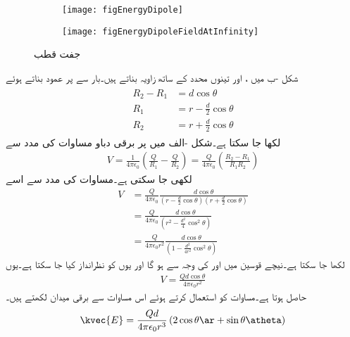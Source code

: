 \begin{figure}
\centering
\begin{subfigure}{0.5\textwidth}
\centering
\texttt{[image: figEnergyDipole]}
\end{subfigure}%
%
\begin{subfigure}{0.5\textwidth}
\centering
\texttt{[image: figEnergyDipoleFieldAtInfinity]}
\end{subfigure}%
\caption{جفت قطب}
\label{شکل_توانائی_جفت_قطب}
\end{figure}

شکل -ب میں ،  اور   تینوں  محدد کے ساتھ  زاویہ بناتے ہیں۔بار  سے  پر عمود بناتے ہوئے
\begin{gather}
\begin{aligned}\label{مساوات_توانائی_جفت_قطب_فاصلوں_میں_فرق}
R_2-R_1&=d \cos \theta \\
R_1 & =r-\frac{d}{2} \cos \theta\\
R_2 & =r+\frac{d}{2} \cos \theta
\end{aligned}
\end{gather}
لکھا جا سکتا ہے۔شکل -الف میں  پر برقی دباو  مساوات  کی مدد سے
\begin{align}\label{مساوات_توانائی_جفت_قطب_دباو_بنیادی_مساوات}
V=\frac{1}{4\pi \epsilon_0} \left(\frac{Q}{R_1}-\frac{Q}{R_2}\right)=\frac{Q}{4\pi \epsilon_0} \left(\frac{R_2-R_1}{R_1 R_2}\right)
\end{align}
لکھی جا سکتی ہے۔مساوات  کی مدد سے اسے
\begin{align*}
V&=\frac{Q}{4\pi \epsilon_0} \frac{d \cos \theta}{(r-\frac{d}{2} \cos \theta)(r+\frac{d}{2} \cos \theta)}\\
&=\frac{Q}{4\pi \epsilon_0} \frac{d \cos \theta}{(r^2-\frac{d^2}{4} \cos^2 \theta)}\\
&=\frac{Q}{4\pi \epsilon_0 r^2} \frac{d \cos \theta}{(1-\frac{d^2}{4 r^2} \cos^2 \theta)}
\end{align*}
لکھا جا سکتا ہے۔نیچے قوسین میں  اور  کی وجہ سے  ہو گا اور یوں  کو نظرانداز کیا جا سکتا ہے۔یوں
\begin{align}\label{مساوات_توانائی_جفت_قطب_دباو}
V=\frac{Qd \cos \theta}{4\pi \epsilon_0 r^2}
\end{align} 
حاصل ہوتا ہے۔مساوات  کو استعمال کرتے ہوئے اس مساوات سے برقی میدان لکھتے ہیں۔
\begin{align}\label{مساوات_توانائی_جفت_قطب_دور_میدان_الف}
\kvec{E}=\frac{Q d}{4\pi \epsilon_0 r^3}\left(2 \cos \theta \ar+\sin \theta \atheta \right)
\end{align}

